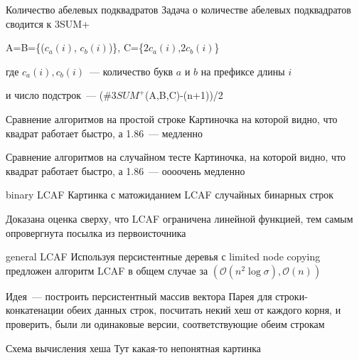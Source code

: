 \documentclass[hyperref=unicode,graphics=pdflatex,12pt]{beamer}
\begin{document}
\begin{frame}{Количество абелевых подквадратов}
Задача о количестве абелевых подквадратов сводится к 3SUM+
\vspace{0.5cm}

 A=B=\{($c_a(i)$, $c_b(i)$)\}, C=\{$2c_a(i)$,$2c_b(i)$\}
\vspace{0.5cm}

где $c_a(i), c_b(i)$~--- количество букв $a$ и $b$ на префиксе длины $i$
\vspace{0.5cm}

 и число подстрок~--- (\#3$SUM^+$(A,B,C)-(n+1))/2

\end{frame}

\begin{frame}{Сравнение алгоритмов на простой строке}
Картиночка на которой видно, что квадрат работает быстро, а 1.86~--- медленно
\end{frame}

\begin{frame}{Сравнение алгоритмов на случайном тесте}
Картиночка, на которой видно, что квадрат работает быстро, а 1.86~--- оооочень медленно
\end{frame}

\begin{frame}{binary LCAF}
Картинка с матожиданием LCAF случайных бинарных строк

\vspace{0.5cm}
Доказана оценка сверху, что LCAF ограничена линейной функцией, тем самым опровергнута посылка из первоисточника
\end{frame}

\begin{frame}{general LCAF}
Используя персистентные деревья с limited node copying предложен алгоритм LCAF в общем случае за $(\mathcal{O}(n^2 \log \sigma), \mathcal{O}(n))$

\vspace{0.5cm}
Идея~--- построить персистентный массив вектора Парея для строки-конкатенации обеих данных строк, посчитать некий хеш от каждого корня, и проверить, были ли одинаковые версии, соответствующие обеим строкам
\end{frame}


\begin{frame}{Схема вычисления хеша}
Тут какая-то непонятная картинка
\end{frame}
\end{document}
